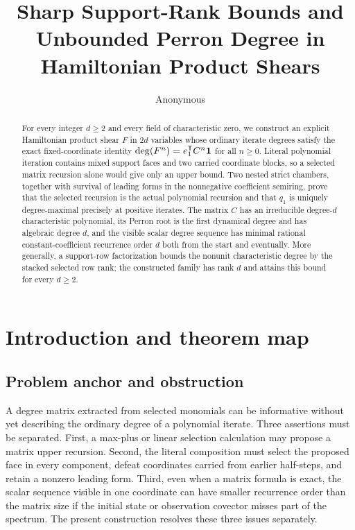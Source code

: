 \documentclass[11pt,letterpaper]{article}
\theoremstyle{plain}
\begin{document}
\title{Sharp Support-Rank Bounds and Unbounded Perron Degree in Hamiltonian Product Shears}
\author{Anonymous}
\date{}
\maketitle
{}

\begin{abstract}
For every integer $d\geq2$ and every field of characteristic zero, we construct an explicit Hamiltonian product shear $F$ in $2d$ variables whose ordinary iterate degrees satisfy the exact fixed-coordinate identity $\deg(F^n)=e_1^{\mathsf{T}}C^n\mathbf{1}$ for all $n\geq0$.  Literal polynomial iteration contains mixed support faces and two carried coordinate blocks, so a selected matrix recursion alone would give only an upper bound.  Two nested strict chambers, together with survival of leading forms in the nonnegative coefficient semiring, prove that the selected recursion is the actual polynomial recursion and that $q_1$ is uniquely degree-maximal precisely at positive iterates.  The matrix $C$ has an irreducible degree-$d$ characteristic polynomial, its Perron root is the first dynamical degree and has algebraic degree $d$, and the visible scalar degree sequence has minimal rational constant-coefficient recurrence order $d$ both from the start and eventually.  More generally, a support-row factorization bounds the nonunit characteristic degree by the stacked selected row rank; the constructed family has rank $d$ and attains this bound for every $d\geq2$.
\end{abstract}

\section{Introduction and theorem map}
\label{sec:introduction}

\subsection{Problem anchor and obstruction}

A degree matrix extracted from selected monomials can be informative without yet describing the ordinary degree of a polynomial iterate.  Three assertions must be separated.  First, a max-plus or linear selection calculation may propose a matrix upper recursion.  Second, the literal composition must select the proposed face in every component, defeat coordinates carried from earlier half-steps, and retain a nonzero leading form.  Third, even when a matrix formula is exact, the scalar sequence visible in one coordinate can have smaller recurrence order than the matrix size if the initial state or observation covector misses part of the spectrum.  The present construction resolves these three issues separately.
\end{document}
